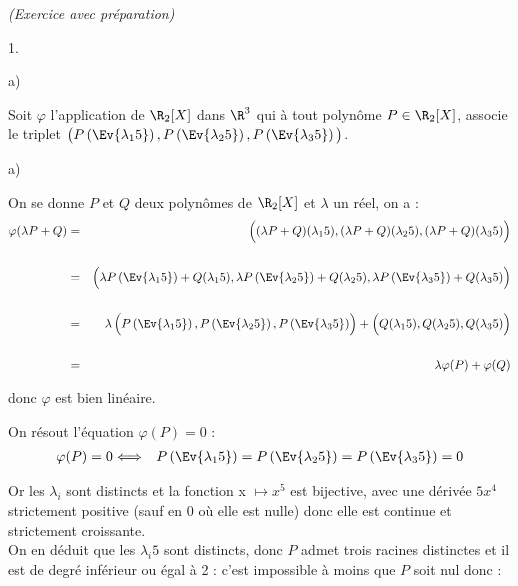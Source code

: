 \documentclass[11pt]{article}%
\begin{document}
\begin{exercice}{\it (Exercice avec préparation)}
\begin{noliste}{1.}
\begin{noliste}{a)}
 \end{noliste}

 \item Soit $\varphi$ l'application de $\R_{2} [X]$ dans $\R^{3}$ qui à
tout polynôme $P \in \R_{2} [X]$, associe le triplet $\big( P
\left(\Ev{\lambda_{1}{5}}\right), P \left(\Ev{\lambda_{2}{5}}\right),
P\left(\Ev{ \lambda_{3}{5} }\right) \big)$. \begin{noliste}{a)}
 \setlength{\itemsep}{2mm}

 \item On se donne $P$ et $Q$ deux polynômes de $\R_{2} [X]$ et
$\lambda$ un réel, on a :
 \begin{eqnarray*}
 \varphi ( \lambda P + Q ) & = & \left( \rule{0cm}{0.4cm} ( \lambda P +
Q ) (\lambda_{1}{5} ), ( \lambda P + Q ) (\lambda_{2}{5} ), ( \lambda P
+ Q ) (\lambda_{3}{5} ) \right) \\
\\
 & = & \left( \rule{0cm}{0.4cm} \lambda P \left(\Ev{\lambda_{1}{5}
}\right) + Q (\lambda_{1}{5} ), \lambda P \left(\Ev{\lambda_{2}{5}
}\right) + Q (\lambda_{2}{5} ), \lambda P \left(\Ev{\lambda_{3}{5}
}\right) + Q (\lambda_{3}{5} ) \right) \\
\\
 & = & \lambda \left( \rule{0cm}{0.4cm} P \left(\Ev{\lambda_{1}{5}
}\right), P \left(\Ev{\lambda_{2}{5} }\right), P
\left(\Ev{\lambda_{3}{5} }\right) \right) + \left( \rule{0cm}{0.4cm} Q
(\lambda_{1}{5} ), Q (\lambda_{2}{5} ), Q (\lambda_{3}{5} ) \right) \\
\\
 & = & \lambda \varphi (P) + \varphi (Q) 
 \end{eqnarray*}

 donc $\varphi$ est bien linéaire. \\

 \item On résout l'équation $\varphi (P ) = 0$ : 
 \begin{eqnarray*}
 \varphi (P ) = 0 & \Longleftrightarrow & P \left(\Ev{ \lambda_{1}{5}
}\right) = P \left(\Ev{ \lambda_{2}{5} }\right) = P \left(\Ev{
\lambda_{3}{5} }\right) = 0 
 \end{eqnarray*}

 Or les $\lambda_{i}$ sont distincts et la fonction x $\mapsto x^{5}$
est bijective, avec une dérivée $5 x^{4}$ strictement positive (sauf en
0 où elle est nulle) donc elle est continue et strictement croissante.
\\

 On en déduit que les $\lambda_{i}{5}$ sont distincts, donc $P$ admet
trois racines distinctes et il est de degré inférieur ou égal à 2 :
c'est impossible à moins que $P$ soit nul donc : 
 

\end{noliste}
\end{noliste}
\end{exercice}
\end{document}
